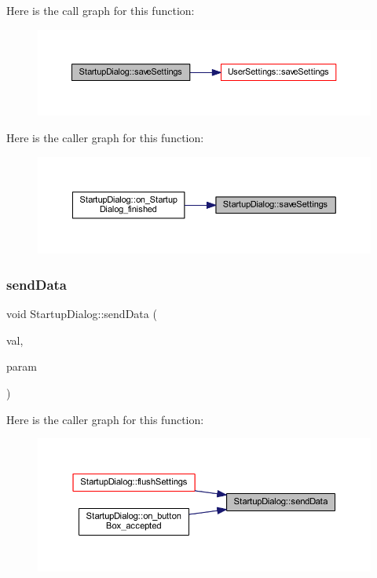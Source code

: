 Here is the call graph for this function\+:
\nopagebreak
\begin{figure}[H]
\begin{center}
\leavevmode
\includegraphics[width=350pt]{classStartupDialog_a2c474c7787e0ea42958cb48f12f4e5c7_cgraph}
\end{center}
\end{figure}
Here is the caller graph for this function\+:
\nopagebreak
\begin{figure}[H]
\begin{center}
\leavevmode
\includegraphics[width=350pt]{classStartupDialog_a2c474c7787e0ea42958cb48f12f4e5c7_icgraph}
\end{center}
\end{figure}
\mbox{\label{classStartupDialog_a46bdde0c52c20bbcc06a48bfa25df5db}} 
\subsubsection{\texorpdfstring{sendData}{sendData}}
{\footnotesize\ttfamily void Startup\+Dialog\+::send\+Data (\begin{DoxyParamCaption}\item[{unsigned int}]{val,  }\item[{Q\+String}]{param }\end{DoxyParamCaption})\hspace{0.3cm}{\ttfamily [signal]}}

Here is the caller graph for this function\+:
\nopagebreak
\begin{figure}[H]
\begin{center}
\leavevmode
\includegraphics[width=350pt]{classStartupDialog_a46bdde0c52c20bbcc06a48bfa25df5db_icgraph}
\end{center}
\end{figure}


